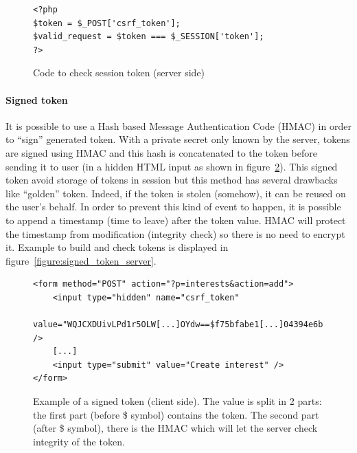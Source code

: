 \documentclass[a4paper,11pt,openany]{report}
\begin{document}
  \begin{figure}[h!t]
  \begin{verbatim}
<?php
$token = $_POST['csrf_token'];
$valid_request = $token === $_SESSION['token'];
?>
  \end{verbatim}
  \caption{Code to check session token (server side)}
  \label{figure:session_token_server}
  \end{figure}
  
  \paragraph{Signed token} %
  It is possible to use a Hash based Message Authentication Code (HMAC) in order to ``sign'' 
  generated token. With a private secret only known by the server, tokens are signed using 
  HMAC and this hash is concatenated to the token before sending it to user (in a hidden 
  HTML input as shown in figure~\ref{figure:signed_token_client}). This signed token avoid 
  storage of tokens in session but this method has several drawbacks like ``golden'' token. 
  Indeed, if the token is stolen (somehow), it can be reused on the user's behalf. In order 
  to prevent this kind of event to happen, it is possible to append a timestamp (time to 
  leave) after the token value. HMAC will protect the timestamp from modification (integrity 
  check) so there is no need to encrypt it. Example to build and check tokens is displayed 
  in figure~\ref{figure:signed_token_server}.
  
  \begin{figure}[h!t]
  \begin{verbatim}
<form method="POST" action="?p=interests&action=add">
    <input type="hidden" name="csrf_token" 
        value="WQJCXDUivLPd1r5OLW[...]OYdw==$f75bfabe1[...]04394e6b" />
    [...]
    <input type="submit" value="Create interest" />
</form>
  \end{verbatim}
  \caption{Example of a signed token (client side). The value is split in 2 parts: the first part 
  (before \$ symbol) contains the token. The second part (after \$ symbol), there is the HMAC which 
  will let the server check integrity of the token.}
  \label{figure:signed_token_client}
  \end{figure}
  
\end{document}
